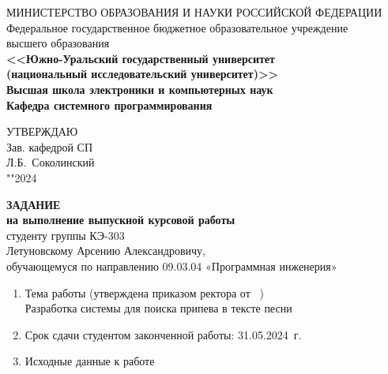 \newpage
\thispagestyle{empty}

\begin{adjustwidth}{-1.5cm}{0.5cm}
\begin{linespread}{1}
\begin{center}


\small{
МИНИСТЕРСТВО ОБРАЗОВАНИЯ И НАУКИ РОССИЙСКОЙ ФЕДЕРАЦИИ\\
Федеральное государственное бюджетное образовательное учреждение\\
высшего образования\\
\textbf{<<Южно-Уральский государственный университет\\
(национальный исследовательский университет)>>\\
Высшая школа электроники и компьютерных наук\\
Кафедра системного программирования}
}



\vspace{2em}

\hfill{}
\parbox{7cm}{
УТВЕРЖДАЮ \\
Зав. кафедрой СП \\[0.5em]
\underfield{} Л.Б.~Соколинский \\[0.5em]
"\underline{\qquad}"\underfield{}2024
}

\vspace{2em}

\textbf{ЗАДАНИЕ} \\
\textbf{на выполнение выпускной курсовой работы}\\
студенту группы КЭ-303\\
Летуновскому Арсению Александровичу,\\
обучающемуся по направлению 09.03.04 «Программная инженерия» 

\end{center}

\vspace{2em}

{
\small
\begin{enumerate}
	\bf\item Тема работы \rm
	(утверждена приказом ректора от  \No~)\\
	Разработка системы для поиска припева в тексте песни

	\bf\item Срок сдачи студентом законченной работы: \rm
	31.05.2024~г.

	\bf\item Исходные данные к работе\rm
	\begin{enumerate}%
		\raggedright


\end{enumerate}
\end{enumerate}}
\end{linespread}
\end{adjustwidth}
